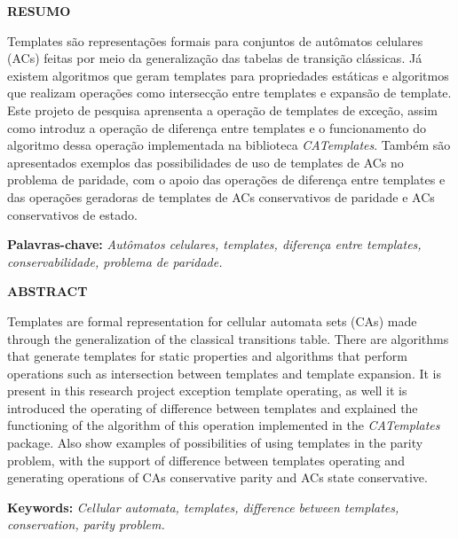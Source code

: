 \newpage
\thispagestyle{plain}
\begin{center}
\large
\textbf{RESUMO}
\end{center}
Templates são representações formais para conjuntos de autômatos celulares (ACs) feitas por meio da generalização das tabelas de transição clássicas. Já existem algoritmos que geram templates para propriedades estáticas e algoritmos que realizam operações como intersecção entre templates e expansão de template. Este projeto de pesquisa aprensenta a operação de templates de exceção, assim como introduz a operação de diferença entre templates e o funcionamento do algoritmo dessa operação implementada na biblioteca \textit{CATemplates}. Também são apresentados exemplos das possibilidades de uso de templates de ACs no problema de paridade, com o apoio das operações de diferença entre templates e das operações geradoras de templates de ACs conservativos de paridade e ACs conservativos de estado.
\\[0.5cm]
\begin{flushleft}
{\bf Palavras-chave:} {\it Autômatos celulares, templates, diferença entre templates, conservabilidade, problema de paridade.}
\end{flushleft}

\newpage
\thispagestyle{plain}
\begin{center}
\large  
\textbf{ABSTRACT}
\end{center}
Templates are formal representation for cellular automata sets (CAs) made through the generalization of the classical transitions table. There are algorithms that generate templates for static properties and algorithms that perform operations such as intersection between templates and template expansion. It is present in this research project exception template operating, as well it is introduced the operating of difference between templates and explained the functioning of the algorithm of this operation implemented in the \textit{CATemplates} package. Also show examples of possibilities of using templates in the parity problem, with the support of difference between templates operating and generating operations of CAs conservative parity and ACs state conservative.
\\[0.5cm]
\begin{flushleft}
{\bf Keywords:} {\it Cellular automata, templates, difference between templates, conservation, parity problem.}
\end{flushleft}